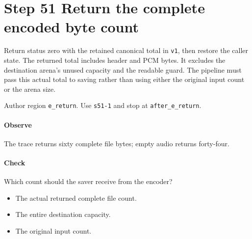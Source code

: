\section{Step 51 Return the complete encoded byte count}\label{pcm-wav-s51}
Return status zero with the retained canonical total in \texttt{v1}, then restore the caller state. The returned total includes header and PCM bytes. It excludes the destination arena's unused capacity and the readable guard. The pipeline must pass this actual total to saving rather than using either the original input count or the arena size.

Author region \texttt{e\_return}. Use \texttt{s51-1} and stop at \texttt{after\_e\_return}.

\paragraph{Observe} The trace returns sixty complete file bytes; empty audio returns forty-four.

\paragraph{Check} Which count should the saver receive from the encoder?
\begin{itemize}
  \item[A.] The actual returned complete file count.
  \item[B.] The entire destination capacity.
  \item[C.] The original input count.
\end{itemize}
